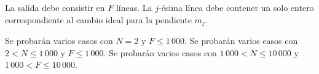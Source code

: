 \documentclass{oci}
\begin{document}
\begin{outputDescription}
La salida debe consistir en $F$ líneas.
La $j$-ésima línea debe contener un solo entero correspondiente al cambio ideal
para la pendiente $m_j$.
\end{outputDescription}

\begin{scoreDescription}
   Se probarán varios casos con $N=2$ y $F\leq 1\,000$.
   Se probarán varios casos con $2 < N \leq 1\,000$ y $F\leq 1\,000$.
   Se probarán varios casos con $1\,000< N \leq 10\,000$ y $1\,000 <
  F\leq 10\,000$.
\end{scoreDescription}

\begin{sampleDescription}
\end{sampleDescription}
\end{document}
